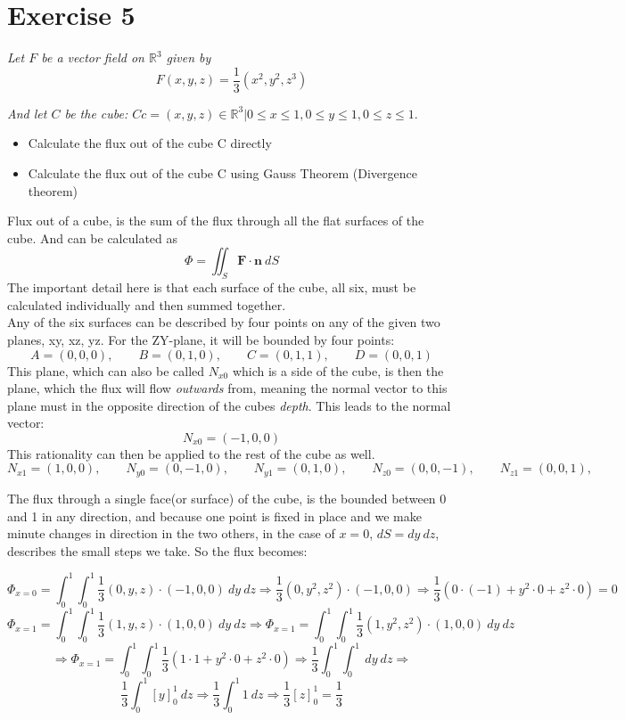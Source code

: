 \section{Exercise 5}
\textit{Let $F$ be a vector field on $\mathbb{R}^3$ given by}
\[F(x,y,z) =\frac{1}{3}(x^2,y^2,z^3)\]

\textit{And let $C$ be the cube: $Cc= {(x,y,z) \in \mathbb{R}^3 | 0 \le x \le 1, 0 \le y \le 1, 0 \le z \le 1 }$}.

\begin{itemize}
    \item Calculate the flux out of the cube C directly
    \item Calculate the flux out of the cube C using Gauss Theorem (Divergence theorem)
\end{itemize}

Flux out of a cube, is the sum of the flux through all the flat surfaces of the cube.
And can be calculated as \[\Phi = \iint_S \mathbf{F} \cdot \mathbf{n} \ dS\]
The important detail here is that each surface of the cube, all six, must be calculated individually 
and then summed together.\\
Any of the six surfaces can be described by four points on any of the given two planes,
xy, xz, yz. For the ZY-plane, it will be bounded by four points: 
\[A = (0,0,0), \qquad B = (0,1,0), \qquad C = (0,1,1), \qquad D = (0,0,1)\]
This plane, which can also be called $N_{x0}$ which is a side of the cube, is then the plane, which the flux will flow \textit{outwards} from,
meaning the normal vector to this plane must in the opposite direction of the cubes \textit{depth}. This leads to the normal vector:
\[N_{x0} = (-1,0,0)\] 
This rationality can then be applied to the rest of the cube as well.
\[
N_{x1} = (1,0,0), \qquad
N_{y0} = (0,-1,0), \qquad
N_{y1} = (0,1,0), \qquad
N_{z0} = (0,0,-1), \qquad
N_{z1} = (0,0,1), \qquad
\] 

The flux through a single face(or surface) of the cube, is the bounded between 0 and 1 in any 
direction, and because one point is fixed in place and we make minute changes in direction in the two others,
in the case of $x=0$, $dS = dy \ dz$, describes the small steps we take. 
So the flux becomes:

\[\Phi_{x=0} = \int_{0}^{1}\int_{0}^{1} \frac{1}{3}(0,y,z) \cdot (-1,0,0)\ dy \ dz \Rightarrow\frac{1}{3}(0, y^2, z^2) \cdot (-1,0,0) \Rightarrow \frac{1}{3} \left(0 \cdot (-1) + y^2\cdot0 + z^2\cdot 0\right) = 0  \]
\[\Phi_{x=1} = \int_{0}^{1}\int_{0}^{1} \frac{1}{3}(1,y,z) \cdot (1,0,0)\ dy \ dz \Rightarrow  \Phi_{x=1} = \int_{0}^{1}\int_{0}^{1} \frac{1}{3}(1, y^2, z^2) \cdot (1,0,0) \ dy \ dz \]
\[\Rightarrow \Phi_{x=1} = \int_{0}^{1}\int_{0}^{1} \frac{1}{3} \left(1 \cdot 1 + y^2\cdot0 + z^2\cdot 0\right) 
\Rightarrow \frac{1}{3} \int_{0}^{1}\int_{0}^{1} \ dy \ dz \Rightarrow \]
\[\frac{1}{3} \int_{0}^{1} \left[y\right]_0^1 \ dz  \Rightarrow \frac{1}{3} \int_{0}^{1} 1 \ dz \Rightarrow \frac{1}{3} \left[z\right]_0^1 = \frac{1}{3} \]


